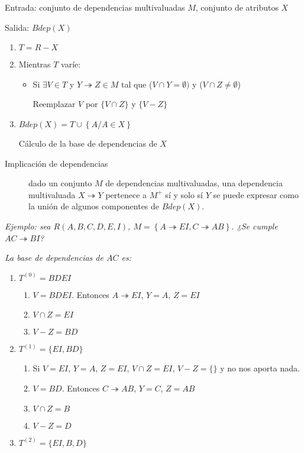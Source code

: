 \documentclass[a4paper, twoside]{article}
\begin{document}
\begin{algorithm}[H]
	Entrada: conjunto de dependencias multivaluadas $M$, conjunto de atributos $X$

	Salida: $Bdep(X)$
	\begin{enumerate}
		\item $T=R-X$
		\item Mientras $T$ varíe:
		\begin{itemize}
			\item Si $\exists V\in T$ y $Y\twoheadrightarrow Z\in M$ tal que ($V\cap Y=\emptyset)$ y ($V\cap Z\neq\emptyset$)

			Reemplazar $V$ por $\{V\cap Z\}$ y $\{V-Z\}$
		\end{itemize}
		\item $Bdep(X)=T\cup\left\{ A/A\in X\right\} $\protect\caption{Cálculo de la base de dependencias de $X$}
	\end{enumerate}
\end{algorithm}

\begin{description}
	\item[Implicación de dependencias] dado un conjunto $M$ de dependencias multivaluadas, una dependencia multivaluada $X \twoheadrightarrow Y$ pertenece a $M^{+}$ sí y solo sí $Y$ se puede expresar como la unión
de algunos componentes de $Bdep(X)$.
\end{description}

\emph{Ejemplo: sea $R(A,B,C,D,E,I)$, $M=\left\{ A\twoheadrightarrow EI,C\twoheadrightarrow AB\right\} $. ¿Se cumple $AC\twoheadrightarrow BI$?}

\emph{La base de dependencias de $AC$ es:}
\begin{enumerate}
	\item $T^{(0)}=BDEI$
	\begin{enumerate}
		\item $V=BDEI$. Entonces $A\twoheadrightarrow EI$, $Y=A$, $Z=EI$
		\item $V\cap Z=EI$
		\item $V-Z=BD$
	\end{enumerate}
	\item $T^{(1)}=\{EI,BD\}$
	\begin{enumerate}
		\item Si $V=EI$, $Y=A$, $Z=EI$, $V\cap Z=EI$, $V-Z=\{\}$ y no nos aporta nada.
		\item $V=BD$. Entonces $C\twoheadrightarrow AB$, $Y=C$, $Z=AB$
		\item $V\cap Z=B$
		\item $V-Z=D$
	\end{enumerate}
	\item $T^{(2)}=\{EI,B,D\}$
\end{enumerate}
\end{document}
